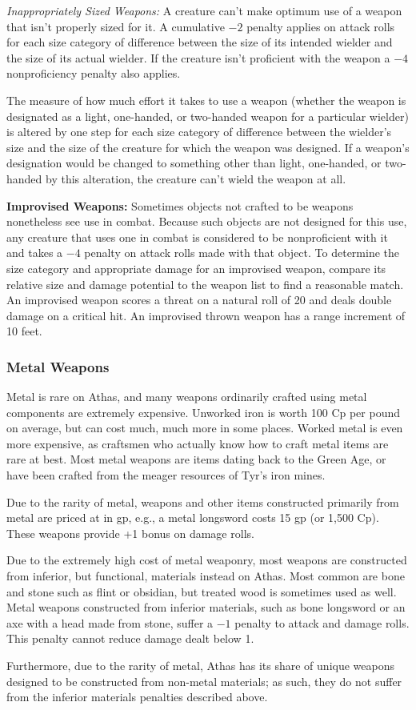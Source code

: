 \textit{Inappropriately Sized Weapons:} A creature can't make optimum use of a weapon that isn't properly sized for it. A cumulative $-2$ penalty applies on attack rolls for each size category of difference between the size of its intended wielder and the size of its actual wielder. If the creature isn't proficient with the weapon a $-4$ nonproficiency penalty also applies.

The measure of how much effort it takes to use a weapon (whether the weapon is designated as a light, one-handed, or two-handed weapon for a particular wielder) is altered by one step for each size category of difference between the wielder's size and the size of the creature for which the weapon was designed. If a weapon's designation would be changed to something other than light, one-handed, or two-handed by this alteration, the creature can't wield the weapon at all.

\textbf{Improvised Weapons:} Sometimes objects not crafted to be weapons nonetheless see use in combat. Because such objects are not designed for this use, any creature that uses one in combat is considered to be nonproficient with it and takes a $-4$ penalty on attack rolls made with that object. To determine the size category and appropriate damage for an improvised weapon, compare its relative size and damage potential to the weapon list to find a reasonable match. An improvised weapon scores a threat on a natural roll of 20 and deals double damage on a critical hit. An improvised thrown weapon has a range increment of 10 feet.

\subsubsection{Metal Weapons}
Metal is rare on Athas, and many weapons ordinarily crafted using metal components are extremely expensive. Unworked iron is worth 100 Cp per pound on average, but can cost much, much more in some places. Worked metal is even more expensive, as craftsmen who actually know how to craft metal items are rare at best. Most metal weapons are items dating back to the Green Age, or have been crafted from the meager resources of Tyr's iron mines.

Due to the rarity of metal, weapons and other items constructed primarily from metal are priced at in gp, e.g., a metal longsword costs 15 gp (or 1,500 Cp). These weapons provide +1 bonus on damage rolls.

Due to the extremely high cost of metal weaponry, most weapons are constructed from inferior, but functional, materials instead on Athas. Most common are bone and stone such as flint or obsidian, but treated wood is sometimes used as well. Metal weapons constructed from inferior materials, such as bone longsword or an axe with a head made from stone, suffer a $-1$ penalty to attack and damage rolls. This penalty cannot reduce damage dealt below 1.

Furthermore, due to the rarity of metal, Athas has its share of unique weapons designed to be constructed from non-metal materials; as such, they do not suffer from the inferior materials penalties described above.
